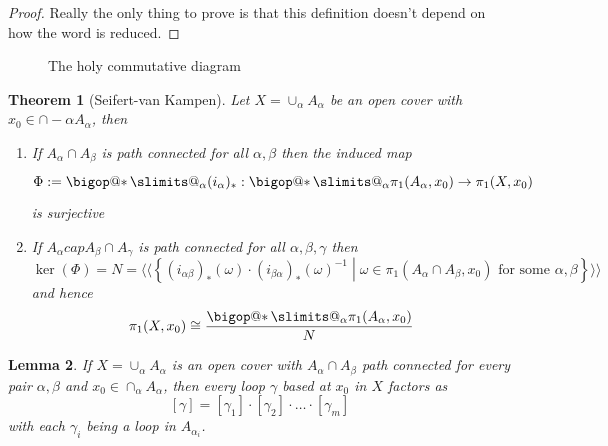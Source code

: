\documentclass[11pt]{article}
\makeatletter
\newcommand{\defeq}{:=}
\newcommand{\relmiddle}[1]{\mathrel{}\middle#1\mathrel{}}
\newcommand{\rmv}{\relmiddle|}
\DeclareRobustCommand\bigop[1]{%
  \mathop{\vphantom{\sum}\mathpalette\bigop@{#1}}\slimits@
}
\newcommand{\bigop@}[2]{%
  \vcenter{%
    \sbox\z@{$#1\sum$}%
    \hbox{\resizebox{\ifx#1\displaystyle.9\fi\dimexpr\ht\z@+\dp\z@}{!}{$\m@th#2$}}%
  }%
}
\newcommand{\bigast}{\DOTSB\bigop{\ast}}
\newtheorem{theorem}{Theorem}[section]
\newtheorem{lemma}[theorem]{Lemma}
\makeatother
\begin{document}
\begin{proof}
Really the only thing to prove is that this definition doesn't depend on how the word is reduced.
\end{proof}

\begin{figure}[H]
	\centering
	\caption{The holy commutative diagram}
\end{figure}

\begin{theorem}[Seifert-van Kampen]
Let $X=\cup_\alpha A_\alpha$ be an open cover with $x_0\in\cap-\alpha A_\alpha$, then
\begin{enumerate}[label=(\roman*)]
	\item If $A_\alpha\cap A_\beta$ is path connected for all $\alpha, \beta$ then the induced map
		\[
			\Phi\defeq\bigast_\alpha(i_\alpha)_\ast:\bigast_\alpha \pi_1(A_\alpha, x_0) \to \pi_1(X, x_0)
		\]
		is surjective
	\item If $A_\alpha cap A_\beta \cap A_\gamma$ is path connected for all $\alpha, \beta, \gamma$ then
		\[
			\ker(\Phi)=N=\langle\langle\left\{(i_{\alpha\beta})_\ast(\omega)\cdot(i_{\beta\alpha})_\ast(\omega)^{-1} \rmv \omega\in\pi_1(A_\alpha\cap A_\beta, x_0)\text{ for some }\alpha,\beta\right\}\rangle\rangle
		\]
		and hence 
		\[
			\pi_1(X, x_0)\cong \frac{\bigast_\alpha \pi_1(A_\alpha, x_0)}{N}
		\]
\end{enumerate}
\end{theorem}

\begin{lemma}
If $X=\cup_\alpha A_\alpha$ is an open cover with $A_\alpha \cap A_\beta$ path connected for every pair $\alpha, \beta$ and $x_0\in\cap_\alpha A_\alpha$, then every loop $\gamma$ based at $x_0$ in $X$ factors as
\[
[\gamma]=[\gamma_1]\cdot[\gamma_2]\cdot\dots\cdot[\gamma_m]
\]
with each $\gamma_i$ being a loop in $A_{\alpha_i}$.
\end{lemma}
\end{document}
